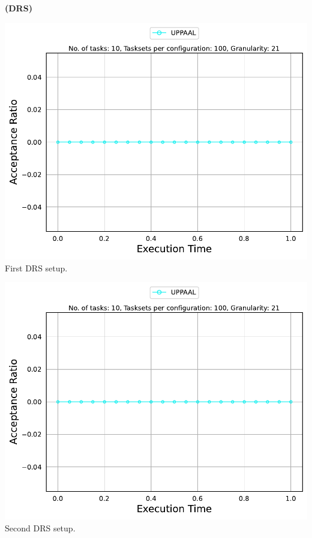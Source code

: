 \documentclass[]{article}
\begin{document}
	\begin{minipage}[t]{0.48\linewidth}
		\centering
		\textbf{(DRS)}
		\vspace{0.3cm}
		
		\includegraphics[width=\linewidth]{UPPAAL[21][0.01-0.1][10].pdf}
		First DRS setup.
		\vspace{0.3cm}
		
		\includegraphics[width=\linewidth]{UPPAAL_2nd.pdf}
		Second DRS setup.
		\vspace{0.3cm}


\end{minipage}
\end{document}
